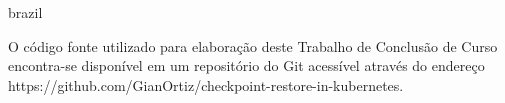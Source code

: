 


%
%

\chapter{}

\begin{otherlanguage*}{brazil}

O código fonte utilizado para elaboração deste Trabalho de Conclusão de Curso encontra-se disponível em
um repositório do Git acessível através do endereço https://github.com/GianOrtiz/checkpoint-restore-in-kubernetes.

\end{otherlanguage*}


